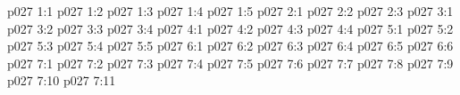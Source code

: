 \vs p027 1:1 
\vs p027 1:2 \pc 
\vs p027 1:3 
\vs p027 1:4 \pc 
\vs p027 1:5 
\vs p027 2:1 
\vs p027 2:2 
\vs p027 2:3 
\vs p027 3:1 
\vs p027 3:2 
\vs p027 3:3 
\vs p027 3:4 
\vs p027 4:1 
\vs p027 4:2 
\vs p027 4:3 
\vs p027 4:4 
\vs p027 5:1 
\vs p027 5:2 
\vs p027 5:3 
\vs p027 5:4 
\vs p027 5:5 
\vs p027 6:1 
\vs p027 6:2 
\vs p027 6:3 
\vs p027 6:4 
\vs p027 6:5 
\vs p027 6:6 
\vs p027 7:1 
\vs p027 7:2 \pc 
\vs p027 7:3 
\vs p027 7:4 \pc 
\vs p027 7:5 
\vs p027 7:6 
\vs p027 7:7 
\vs p027 7:8 \pc 
\vs p027 7:9 \pc 
\vs p027 7:10 
\vsetoff
\vs p027 7:11 
\quizlink
